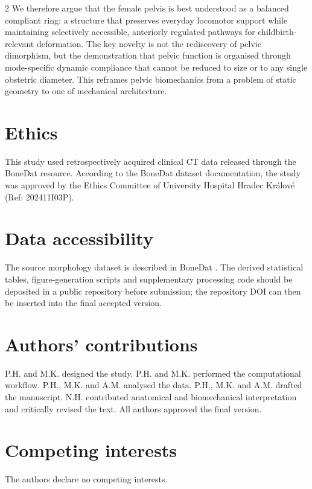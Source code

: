 \documentclass[openacc]{rsproca_new}
\begin{document}
\begin{multicols}{2}
We therefore argue that the female pelvis is best understood as a balanced compliant ring: a structure that preserves everyday locomotor support while maintaining selectively accessible, anteriorly regulated pathways for childbirth-relevant deformation. The key novelty is not the rediscovery of pelvic dimorphism, but the demonstration that pelvic function is organised through mode-specific dynamic compliance that cannot be reduced to size or to any single obstetric diameter. This reframes pelvic biomechanics from a problem of static geometry to one of mechanical architecture.

\section*{Ethics}

This study used retrospectively acquired clinical CT data released through the BoneDat resource. According to the BoneDat dataset documentation, the study was approved by the Ethics Committee of University Hospital Hradec Kr\'{a}lov\'{e} (Ref: 202411I03P).

\section*{Data accessibility}

The source morphology dataset is described in BoneDat \cite{HenysKuchar2025}. The derived statistical tables, figure-generation scripts and supplementary processing code should be deposited in a public repository before submission; the repository DOI can then be inserted into the final accepted version.

\section*{Authors' contributions}

P.H. and M.K. designed the study. P.H. and M.K. performed the computational workflow. P.H., M.K. and A.M. analysed the data. P.H., M.K. and A.M. drafted the manuscript. N.H. contributed anatomical and biomechanical interpretation and critically revised the text. All authors approved the final version.

\section*{Competing interests}

The authors declare no competing interests.


\end{multicols}
\end{document}
